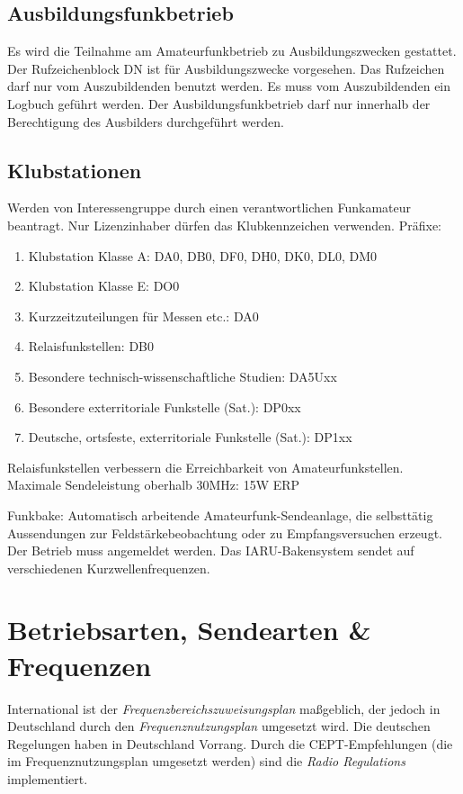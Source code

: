 \documentclass[11pt,BCOR=8.5mm]{scrartcl}
\begin{document}
\subsection{Ausbildungsfunkbetrieb}\label{sub:ausbildungsfunkbetrieb}
Es wird die Teilnahme am Amateurfunkbetrieb zu Ausbildungszwecken
gestattet. Der Rufzeichenblock DN ist für Ausbildungszwecke vorgesehen.
Das Rufzeichen darf nur vom Auszubildenden benutzt werden. Es muss vom
Auszubildenden ein Logbuch geführt werden. Der Ausbildungsfunkbetrieb
darf nur innerhalb der Berechtigung des Ausbilders durchgeführt werden.

\subsection{Klubstationen}\label{sub:klubstationen}
Werden von Interessengruppe durch einen verantwortlichen Funkamateur
beantragt. Nur Lizenzinhaber dürfen das Klubkennzeichen verwenden.
Präfixe:
\begin{enumerate}
  \item Klubstation Klasse A: DA0, DB0, DF0, DH0, DK0, DL0,  DM0
  \item Klubstation Klasse E: DO0
  \item Kurzzeitzuteilungen für Messen etc.: DA0
  \item Relaisfunkstellen: DB0
  \item Besondere technisch-wissenschaftliche Studien: DA5Uxx
  \item Besondere exterritoriale Funkstelle (Sat.): DP0xx
  \item Deutsche, ortsfeste, exterritoriale Funkstelle (Sat.): DP1xx
\end{enumerate}

Relaisfunkstellen verbessern die Erreichbarkeit von Amateurfunkstellen.
Maximale Sendeleistung oberhalb 30MHz: 15W ERP

Funkbake: Automatisch arbeitende Amateurfunk-Sendeanlage, die
selbsttätig Aussendungen zur Feldstärkebeobachtung oder zu
Empfangsversuchen erzeugt. Der Betrieb muss angemeldet werden. Das
IARU-Bakensystem sendet auf verschiedenen Kurzwellenfrequenzen.

\section{Betriebsarten, Sendearten \& Frequenzen}\label{sec:betriebsartensendeartenfrequenzen}

International ist der \emph{Frequenzbereichszuweisungsplan} maßgeblich,
der jedoch in Deutschland durch den \emph{Frequenznutzungsplan}
umgesetzt wird. Die deutschen Regelungen haben in Deutschland Vorrang.
Durch die CEPT-Empfehlungen (die im Frequenznutzungsplan umgesetzt
werden) sind die \emph{Radio Regulations} implementiert.
\end{document}
